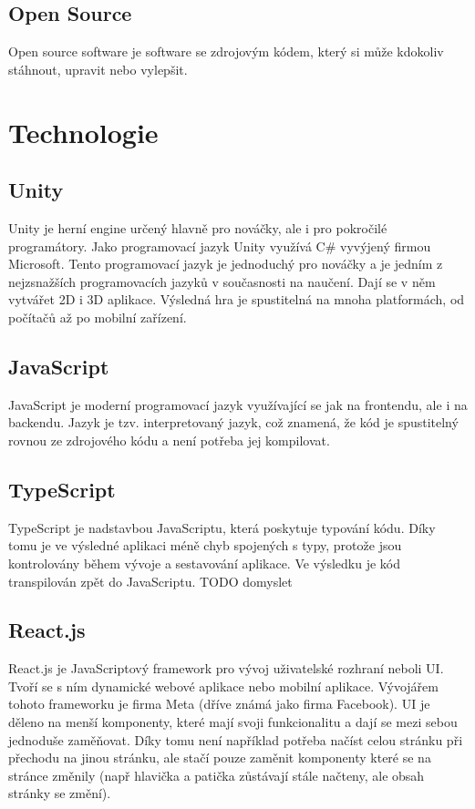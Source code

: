 \subsection{Open Source}
Open source software je software se zdrojovým kódem, který si může kdokoliv stáhnout, upravit nebo vylepšit. \cite{OpenSource}

\section{Technologie}

\subsection{Unity}
Unity je herní engine určený hlavně pro nováčky, ale i pro pokročilé programátory. Jako programovací jazyk Unity využívá C\# vyvýjený firmou Microsoft. Tento programovací jazyk je jednoduchý pro nováčky a je jedním z nejzsnažších programovacích jazyků v současnosti na naučení. \cite{Csharp} Dají se v něm vytvářet 2D i 3D aplikace. Výsledná hra je spustitelná na mnoha platformách, od počítačů až po mobilní zařízení.

\subsection{JavaScript}
JavaScript je moderní programovací jazyk využívající se jak na frontendu, ale i na backendu. Jazyk je tzv. interpretovaný jazyk, což znamená, že kód je spustitelný rovnou ze zdrojového kódu a není potřeba jej kompilovat.

\subsection{TypeScript}
TypeScript je nadstavbou JavaScriptu, která poskytuje typování kódu. Díky tomu je ve výsledné aplikaci méně chyb spojených s typy, protože jsou kontrolovány během vývoje a sestavování aplikace. Ve výsledku je kód transpilován zpět do JavaScriptu.
TODO domyslet

\subsection{React.js}
React.js je JavaScriptový framework pro vývoj uživatelské rozhraní neboli UI. Tvoří se s ním dynamické webové aplikace nebo mobilní aplikace. Vývojářem tohoto frameworku je firma Meta (dříve známá jako firma Facebook). UI je děleno na menší komponenty, které mají svoji funkcionalitu a dají se mezi sebou jednoduše zaměňovat. Díky tomu není například potřeba načíst celou stránku při přechodu na jinou stránku, ale stačí pouze zaměnit komponenty které se na stránce změnily (např hlavička a patička zůstávají stále načteny, ale obsah stránky se změní).

